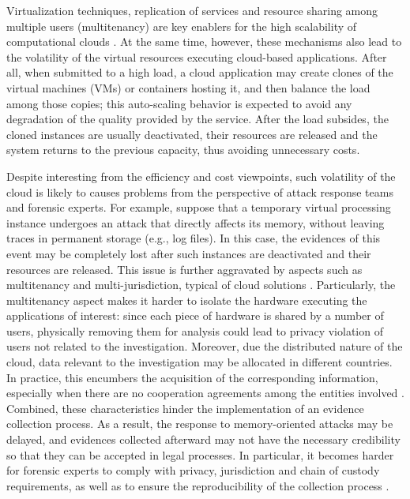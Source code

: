 \documentclass[10pt,journal,compsoc]{IEEEtran}
\begin{document}
%
Virtualization techniques, replication of services and resource sharing among multiple users (multitenancy) are key enablers for the high scalability of computational clouds \cite{Morsy_Cloud_Security:2010}.
%
At the same time, however, these mechanisms also lead to the volatility of the virtual resources executing cloud-based applications.
%
After all, when submitted to a high load, a cloud application may create clones of the virtual machines (VMs) or containers hosting it, and then balance the load among those copies; this auto-scaling behavior is expected to avoid any degradation of the quality provided by the service.
%
After the load subsides, the cloned instances are usually deactivated, their resources are released and the system returns to the previous capacity, thus avoiding unnecessary costs.


%
Despite interesting from the efficiency and cost viewpoints, such volatility of the cloud is likely to causes problems from the perspective of attack response teams and forensic experts.
%
For example, suppose that a temporary virtual processing instance undergoes an attack that directly affects its memory, without leaving traces in permanent storage (e.g., log files).
%
In this case, the evidences of this event may be completely lost after such instances are deactivated and their resources are released.
%
This issue is further aggravated by aspects such as multitenancy and multi-jurisdiction, typical of cloud solutions \cite{Bash_Adv_in_Forensics:2015}.
%
Particularly, the multitenancy aspect makes it harder to isolate the hardware executing the applications of interest: since each piece of hardware is shared by a number of users, physically removing them for analysis could lead to privacy violation of users not related to the investigation. 
%
Moreover, due the distributed nature of the cloud, data relevant to the investigation may be allocated in different countries.
%
In practice, this encumbers the acquisition of the corresponding information, especially when there are no cooperation agreements among the entities involved \cite{Dykstra_Acquiring_for_IAAS:2012}.
%
%
Combined, these characteristics hinder the implementation of an evidence collection process.
%
As a result, the response to memory-oriented attacks may be delayed, and evidences collected afterward may not have the necessary credibility so that they can be accepted in legal processes.
%
In particular, it becomes harder for forensic experts to comply with privacy, jurisdiction and chain of custody requirements, as well as to ensure the reproducibility of the collection process \cite{Rahman_Live_Forensics_Techniques:2015}.
\end{document}
